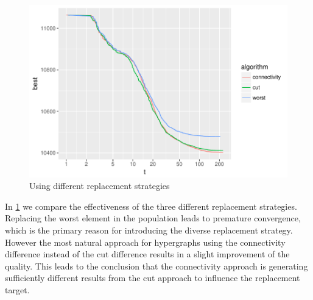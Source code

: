 \documentclass[a4paper,12pt,titlepage, BCOR7mm,headsepline]{scrbook}
\numberwithin{equation}{section}
\begin{document}
\begin{figure}[H]
\caption{Using different replacement strategies}
\label{fig:replacement}
\begin{center}
\includegraphics{bachelorarbeit-replacestrategies}
\end{center}

\end{figure}
In \ref{fig:replacement} we compare the effectiveness of the three different replacement strategies. Replacing the worst element in the population leads to premature convergence, which is the primary reason for introducing the diverse replacement strategy. However the most natural approach for hypergraphs using the connectivity difference instead of the cut difference results in a slight improvement of the quality. This leads to the conclusion that the connectivity approach is generating  sufficiently different results from the cut approach to influence the replacement target.
\end{document}
